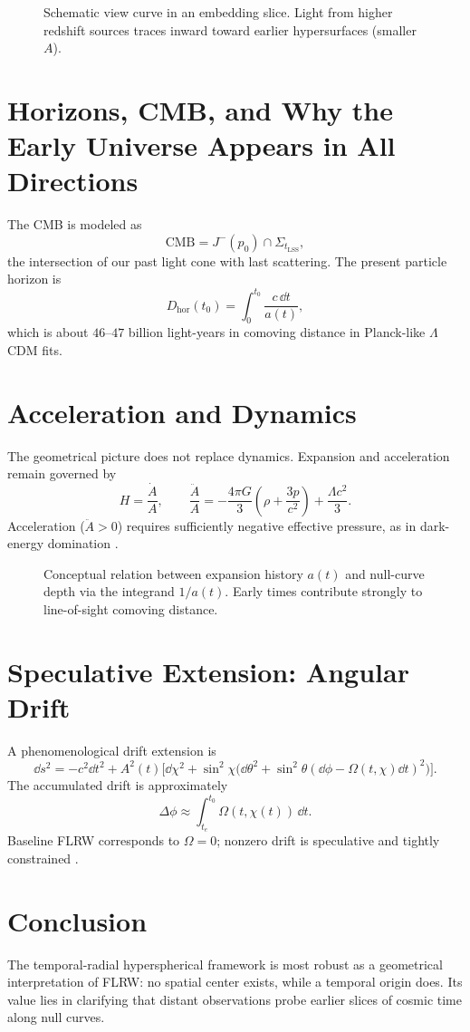 \begin{figure}[htbp]
\centering

\caption{Schematic view curve in an embedding slice. Light from higher redshift sources traces inward toward earlier hypersurfaces (smaller $A$).}
\label{fig:view-curve}
\end{figure}

\section{Horizons, CMB, and Why the Early Universe Appears in All Directions}
The CMB is modeled as
\[
\mathrm{CMB}=J^-(p_0)\cap\Sigma_{t_{\mathrm{LSS}}},
\]
the intersection of our past light cone with last scattering. The present particle horizon is
\[
D_{\mathrm{hor}}(t_0)=\int_0^{t_0}\frac{c\,\dd t}{a(t)},
\]
which is about $46$--$47$ billion light-years in comoving distance in Planck-like $\Lambda$CDM fits.

\section{Acceleration and Dynamics}
The geometrical picture does not replace dynamics. Expansion and acceleration remain governed by
\[
H=\frac{\dot A}{A},\qquad
\frac{\ddot A}{A}=-\frac{4\pi G}{3}\left(\rho+\frac{3p}{c^2}\right)+\frac{\Lambda c^2}{3}.
\]
Acceleration ($\ddot A>0$) requires sufficiently negative effective pressure, as in dark-energy domination \citep{riess1998,perlmutter1999}.

\begin{figure}[htbp]
\centering

\caption{Conceptual relation between expansion history $a(t)$ and null-curve depth via the integrand $1/a(t)$. Early times contribute strongly to line-of-sight comoving distance.}
\label{fig:integrand}
\end{figure}

\section{Speculative Extension: Angular Drift}
A phenomenological drift extension is
\[
\dd s^2=-c^2\dd t^2+A^2(t)\Big[\dd\chi^2+\sin^2\chi\big(\dd\theta^2+\sin^2\theta(\dd\phi-\Omega(t,\chi)\dd t)^2\big)\Big].
\]
The accumulated drift is approximately
\[
\Delta\phi\approx\int_{t_e}^{t_0}\Omega(t,\chi(t))\,\dd t.
\]
Baseline FLRW corresponds to $\Omega=0$; nonzero drift is speculative and tightly constrained \citep{planck2018vii,gruppuso2020}.

\section{Conclusion}
The temporal-radial hyperspherical framework is most robust as a geometrical interpretation of FLRW: no spatial center exists, while a temporal origin does. Its value lies in clarifying that distant observations probe earlier slices of cosmic time along null curves.
